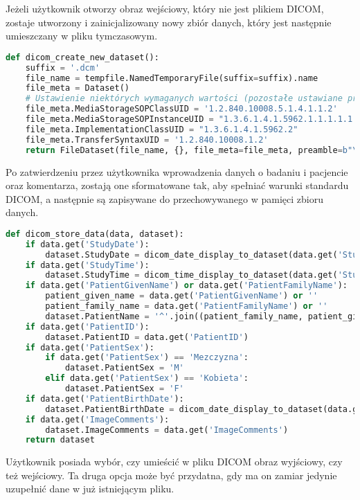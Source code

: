 \documentclass[a4paper]{article}
\begin{document}
Jeżeli użytkownik otworzy obraz wejściowy, który nie jest plikiem DICOM, zostaje utworzony i zainicjalizowany nowy zbiór danych, który jest następnie umieszczany w pliku tymczasowym.
\begin{lstlisting}[language=Python, caption=Tworzenie nowego pliku DICOM, texcl=true]
def dicom_create_new_dataset():
    suffix = '.dcm'
    file_name = tempfile.NamedTemporaryFile(suffix=suffix).name
    file_meta = Dataset()
    # Ustawienie niektórych wymaganych wartości (pozostałe ustawiane przy zapisie)
    file_meta.MediaStorageSOPClassUID = '1.2.840.10008.5.1.4.1.1.2'
    file_meta.MediaStorageSOPInstanceUID = "1.3.6.1.4.1.5962.1.1.1.1.1.20040119072730.12322"
    file_meta.ImplementationClassUID = "1.3.6.1.4.1.5962.2"
    file_meta.TransferSyntaxUID = '1.2.840.10008.1.2'
    return FileDataset(file_name, {}, file_meta=file_meta, preamble=b"\0" * 128)
\end{lstlisting}
Po zatwierdzeniu przez użytkownika wprowadzenia danych o badaniu i pacjencie oraz komentarza, zostają one sformatowane tak, aby spełniać warunki standardu DICOM, a następnie są zapisywane do przechowywanego w pamięci zbioru danych.
\begin{lstlisting}[language=Python, caption=Wpisywanie danych do zbioru danych DICOM]
def dicom_store_data(data, dataset):
    if data.get('StudyDate'):
        dataset.StudyDate = dicom_date_display_to_dataset(data.get('StudyDate'))
    if data.get('StudyTime'):
        dataset.StudyTime = dicom_time_display_to_dataset(data.get('StudyTime'))
    if data.get('PatientGivenName') or data.get('PatientFamilyName'):
        patient_given_name = data.get('PatientGivenName') or ''
        patient_family_name = data.get('PatientFamilyName') or ''
        dataset.PatientName = '^'.join((patient_family_name, patient_given_name))
    if data.get('PatientID'):
        dataset.PatientID = data.get('PatientID')
    if data.get('PatientSex'):
        if data.get('PatientSex') == 'Mezczyzna':
            dataset.PatientSex = 'M'
        elif data.get('PatientSex') == 'Kobieta':
            dataset.PatientSex = 'F'
    if data.get('PatientBirthDate'):
        dataset.PatientBirthDate = dicom_date_display_to_dataset(data.get('PatientBirthDate'))
    if data.get('ImageComments'):
        dataset.ImageComments = data.get('ImageComments')
    return dataset
\end{lstlisting}
Użytkownik posiada wybór, czy umieścić w pliku DICOM obraz wyjściowy, czy też wejściowy. Ta druga opcja może być przydatna, gdy ma on zamiar jedynie uzupełnić dane w już istniejącym pliku.
\end{document}
